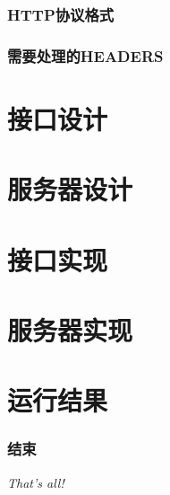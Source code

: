 \documentclass[12pt,dvipdfm]{beamer}
\begin{document}
\begin{frame}
	\frametitle{HTTP协议格式}
\end{frame}

\begin{frame}
	\frametitle{需要处理的HEADERS}
\end{frame}

\section{接口设计}
\section{服务器设计}
\section{接口实现}
\section{服务器实现}
\section{运行结果}

\begin{frame}
	\frametitle{结束}
	\begin{center}
	{\Huge
		\textsl{That's all!}
	}
	\end{center}
\end{frame}
\end{document}
